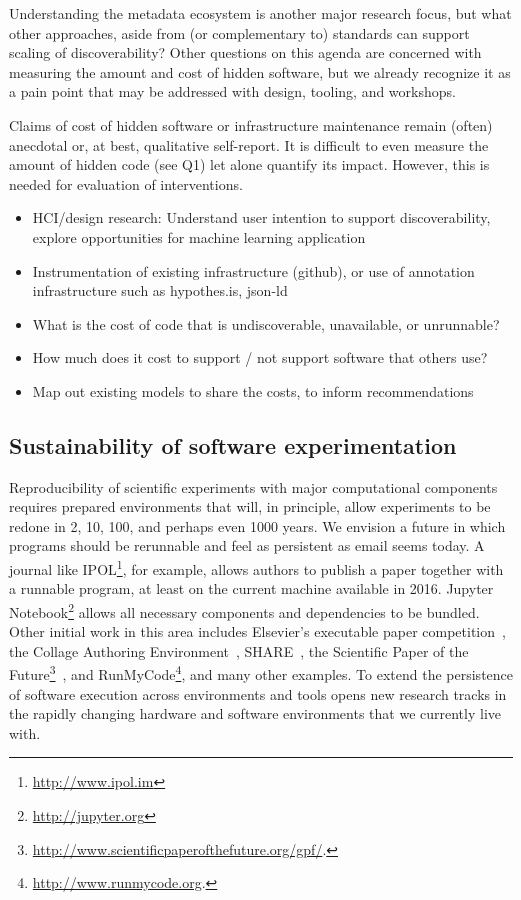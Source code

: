 \documentclass[a4paper,UKenglish]{dagman}
\begin{document}
Understanding the metadata ecosystem is another major research focus, but what other approaches, aside from (or complementary to) standards can support scaling of discoverability? Other questions on this agenda are concerned with measuring the amount and cost of hidden software, but we already recognize it as a pain point that may be addressed with design, tooling, and workshops.


Claims of cost of hidden software or infrastructure maintenance remain (often) anecdotal or, at best, qualitative self-report. It is difficult to even measure the amount of hidden code (see Q1) let alone quantify its impact. However, this is needed for evaluation of interventions.


\begin{itemize}
\item HCI/design research: Understand user intention to support discoverability, explore opportunities for machine learning application
\item Instrumentation of existing infrastructure (github), or use of annotation infrastructure such as hypothes.is, json-ld
\item What is the cost of code that is undiscoverable, unavailable, or unrunnable?
\item How much does it cost to support / not support software that others use?
\item Map out existing models to share the costs, to inform recommendations
\end{itemize}


\subsection{Sustainability of software experimentation}

Reproducibility of scientific experiments with major computational components requires prepared environments that will, in principle, allow experiments to be redone in 2, 10, 100, and perhaps even 1000 years. We envision a future in which programs should be rerunnable and feel as persistent as email seems today. A journal like IPOL\footnote{\url{http://www.ipol.im}}, for example, allows authors to publish a paper together with a runnable program, at least on the current machine available in 2016. Jupyter Notebook\footnote{\url{http://jupyter.org}} allows all necessary components and dependencies to be bundled. Other initial work in this area includes Elsevier's executable paper competition~\cite{execpapers}, the Collage Authoring Environment~\cite{NOWAKOWSKI2011608},
SHARE~\cite{DBLP:journals/procedia/GorpM11}, the Scientific Paper of the Future\footnote{\url{http://www.scientificpaperofthefuture.org/gpf/}.}~\cite{onto_soft_what_2016}, and RunMyCode\footnote{\url{http://www.runmycode.org}.}, and many other examples.
To extend the persistence of software execution across environments and tools opens new research tracks in the rapidly changing hardware and software environments that we currently live with.
\end{document}
